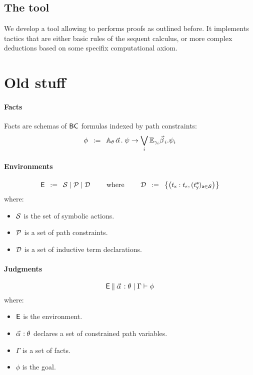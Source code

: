 \documentclass[a4paper]{article}
\theoremstyle{remark}
\begin{document}
\subsection{The tool}

We develop a tool allowing to performs proofs as outlined before. It implements tactics that are either basic rules of the sequent calculus, or more complex deductions based on some specifix computational axiom.







\newpage
\section{Old stuff}



\paragraph{Facts}
Facts are schemas of $\textsf{BC}$ formulas indexed by path constraints:
\[
  \phi \mdef
  \cforall_\theta\, \valpha.\;
  \psi
  \ra
  \bigvee_{i}
  \cexists_\gammai \vbetai. \psi_i
\]

\paragraph{Environments}
\[
  \textsf{E} \;\;\mathbin{:=}\;\;
  \mathcal{S} \mid
  \mathcal{P} \mid
  \mathcal{D}
  \qquad
  \text{ where }
  \qquad
  \mathcal{D} \;\;\mathbin{:=}\;\;
  \left\{
    \left(t_{\textsf{x}} : t_\epsilon,(t_{\textsf{y}}^{\textsf{a}})_{{\textsf{a}} \in \mathcal{S}}\right)
  \right\}
\]
where:
\begin{itemize}
\item $\mathcal{S}$ is the set of symbolic actions.
\item $\mathcal{P}$ is a set of path constraints.
\item $\mathcal{D}$ is a set of inductive term declarations.
\end{itemize}
\paragraph{Judgments}
\[
  \ejudge{\env}{\facts{\valpha}{\theta}{\Gamma}}{\phi}
\]
where:
\begin{itemize}
\item $\textsf{E}$ is the environment.
\item $\pvtype{\valpha}{\theta}$ declares a set of constrained path variables.
\item $\Gamma$ is a set of facts.
\item $\phi$ is the goal.
\end{itemize}
\end{document}
